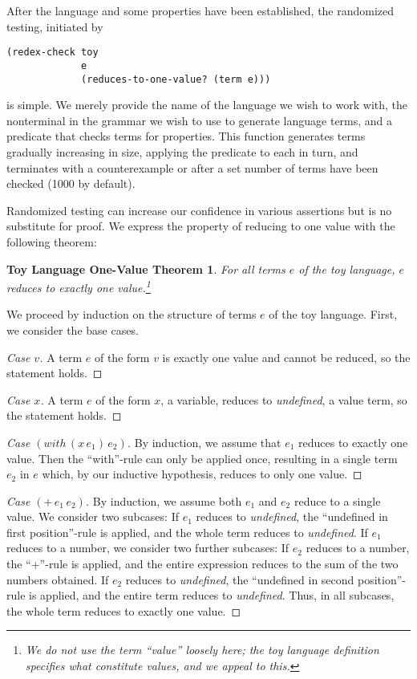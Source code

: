 \documentclass[ms,electronic,twosidetoc,letterpaper,chaptercenter,parttop]{byumsphd}
\begin{document}
After the language and some properties have been established, the randomized testing, 
initiated by
\begin{verbatim}
(redex-check toy
             e
             (reduces-to-one-value? (term e)))
\end{verbatim}
is simple. We merely provide the name of the language we wish to work with, the
nonterminal in the grammar we wish to use to generate language terms, and a predicate that
checks terms for properties. This function generates terms gradually increasing in size,
applying the predicate to each in turn, and terminates with a counterexample or after a
set number of terms have been checked (1000 by default).

Randomized testing can increase our confidence in various assertions but is no substitute 
for proof. We express the property of reducing to one value with the following theorem:

\newtheorem*{toythm}{Toy Language One-Value Theorem}
\begin{toythm}
For all terms $e$ of the toy language, $e$ reduces to exactly one value.\footnote{We do 
not use the term ``value'' loosely here; the toy language definition specifies what 
constitute values, and we appeal to this.}
\end{toythm}
We proceed by induction on the structure of terms $e$ of the toy language. First, we 
consider the base cases.
\begin{proof}[Case $v$]
A term $e$ of the form $v$ is exactly one value and cannot be reduced, so the statement 
holds.
\end{proof}
\begin{proof}[Case $x$]
A term $e$ of the form $x$, a variable, reduces to \emph{undefined}, a value term, so the 
statement holds.
\end{proof}
\begin{proof}[Case $(with\,(x\,e_{1})\,e_{2})$]
By induction, we assume that $e_{1}$ reduces to exactly one value. Then the ``with''-rule
can only be applied once, resulting in a single term $e_{2}$ in $e$ which, by our
inductive hypothesis, reduces to only one value.
\end{proof}
\begin{proof}[Case $(+\,e_{1}\,e_{2})$]
By induction, we assume both $e_{1}$ and $e_{2}$ reduce to a single value. We consider two
subcases: If $e_{1}$ reduces to \emph{undefined}, the ``undefined in first position''-rule
is applied, and the whole term reduces to \emph{undefined}. If $e_{1}$ reduces to a
number, we consider two further subcases: If $e_{2}$ reduces to a number, the ``+''-rule
is applied, and the entire expression reduces to the sum of the two numbers obtained. If
$e_{2}$ reduces to \emph{undefined}, the ``undefined in second position''-rule is applied,
and the entire term reduces to \emph{undefined}. Thus, in all subcases, the whole term 
reduces to exactly one value.
\end{proof}
\end{document}
